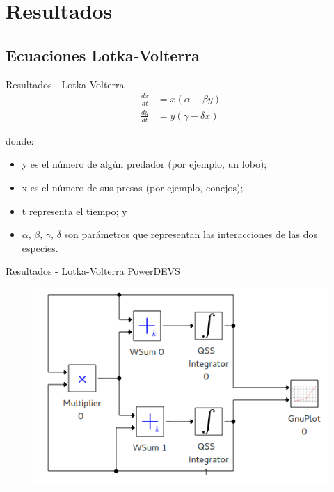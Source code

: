 \documentclass{beamer}
\makeatletter
\newcommand*{\centerfloat}{%
  \parindent \z@
  \leftskip \z@ \@plus 1fil \@minus \textwidth
  \rightskip\leftskip
  \parfillskip \z@skip}
\makeatother
\begin{document}

\chapter{Resultados}
\section{Ecuaciones Lotka-Volterra}
\begin{frame}{Resultados - Lotka-Volterra}
\begin{align*}
\frac{dx}{dt} & = x(\alpha - \beta y)\\
\frac{dy}{dt} & =y(\gamma - \delta  x)
\end{align*}

donde:
\begin{itemize}
    \item y es el número de algún predador (por ejemplo, un lobo);
    \item x es el número de sus presas (por ejemplo, conejos);
    \item t representa el tiempo; y
    \item $\alpha$, $\beta$, $\gamma$, $\delta$ son parámetros que representan las interacciones de las dos especies.
\end{itemize}
\end{frame}

\begin{frame}{Resultados  - Lotka-Volterra PowerDEVS}
\begin{figure}[H]
\includegraphics[width=\linewidth]{lotka_volterra_pwd}
\label{model:lotka_volterra}
\end{figure}
\end{frame}
\end{document}
